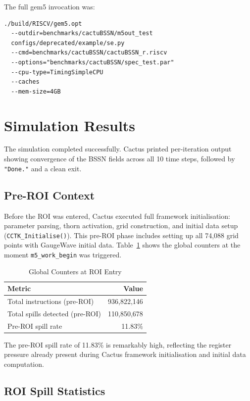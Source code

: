 \documentclass[conference]{IEEEtran}
\begin{document}
The full gem5 invocation was:

\begin{verbatim}
./build/RISCV/gem5.opt
  --outdir=benchmarks/cactuBSSN/m5out_test
  configs/deprecated/example/se.py
  --cmd=benchmarks/cactuBSSN/cactuBSSN_r.riscv
  --options="benchmarks/cactuBSSN/spec_test.par"
  --cpu-type=TimingSimpleCPU
  --caches
  --mem-size=4GB
\end{verbatim}

\section{Simulation Results}

The simulation completed successfully. Cactus printed per-iteration
output showing convergence of the BSSN fields across all 10 time
steps, followed by \texttt{"Done."} and a clean exit.

\subsection{Pre-ROI Context}

Before the ROI was entered, Cactus executed full framework
initialisation: parameter parsing, thorn activation, grid construction,
and initial data setup (\texttt{CCTK\_Initialise()}). This pre-ROI
phase includes setting up all 74,088 grid points with GaugeWave
initial data.
Table~\ref{tab:preroi} shows the global counters at the moment
\texttt{m5\_work\_begin} was triggered.

\begin{table}[H]
\centering
\caption{Global Counters at ROI Entry}
\label{tab:preroi}
\begin{tabular}{lr}
\toprule
\textbf{Metric} & \textbf{Value} \\
\midrule
Total instructions (pre-ROI) & 936,822,146 \\
Total spills detected (pre-ROI) & 110,850,678 \\
Pre-ROI spill rate & 11.83\% \\
\bottomrule
\end{tabular}
\end{table}

The pre-ROI spill rate of 11.83\% is remarkably high, reflecting the
register pressure already present during Cactus framework initialisation
and initial data computation.

\subsection{ROI Spill Statistics}
\end{document}
